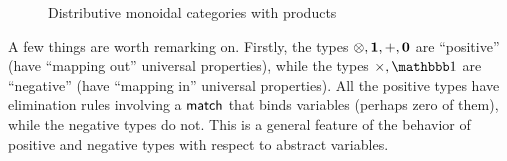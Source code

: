 \begin{figure}
  \centering
  \caption{Distributive monoidal categories with products}
  \label{fig:moncat-prod-coprod}
\end{figure}

A few things are worth remarking on.
Firstly, the types $\otimes,\mathbf{1},+,\mathbf{0}$ are ``positive'' (have ``mapping out'' universal properties), while the types $\times,\unit$ are ``negative'' (have ``mapping in'' universal properties).
All the positive types have elimination rules involving a $\mathsf{match}$ that binds variables (perhaps zero of them), while the negative types do not.
This is a general feature of the behavior of positive and negative types with respect to abstract variables.

